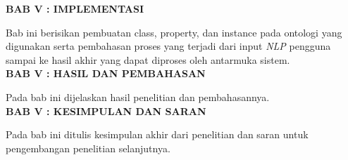 \noindent
\textbf{BAB V : IMPLEMENTASI}

Bab ini berisikan pembuatan class, property, dan instance pada ontologi yang digunakan serta pembahasan proses yang terjadi dari input \emph{NLP} pengguna sampai ke hasil akhir yang dapat diproses oleh antarmuka sistem.\\

\noindent
\textbf{BAB V : HASIL DAN PEMBAHASAN}

Pada bab ini dijelaskan hasil penelitian dan pembahasannya.\\

\noindent
\textbf{BAB V : KESIMPULAN DAN SARAN}

Pada bab ini ditulis kesimpulan akhir dari penelitian dan saran untuk pengembangan penelitian selanjutnya.\\

